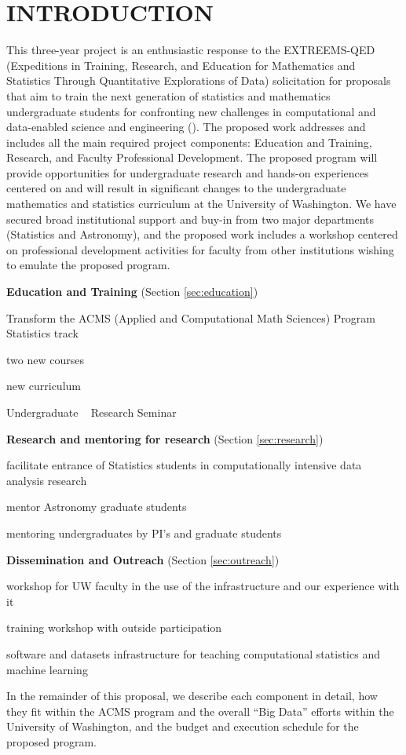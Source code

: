 \section{ INTRODUCTION}

This three-year project is an enthusiastic response to the EXTREEMS-QED (Expeditions in Training, Research, 
and Education for Mathematics and Statistics Through Quantitative Explorations of Data) solicitation for proposals
that aim to train the next generation of statistics and mathematics undergraduate students for confronting new
challenges in computational and data-enabled science and engineering (\cdse).  The proposed work addresses and 
includes all the main required project components: Education and Training, Research, and Faculty Professional 
Development. The proposed program will provide opportunities for undergraduate research and hands-on experiences 
centered on \cdse and will result in significant changes to the undergraduate mathematics and statistics curriculum 
at the University of Washington. We have secured broad institutional support and buy-in from two major departments 
(Statistics and Astronomy), and the proposed work includes a workshop centered on professional development activities
for faculty from other institutions wishing to emulate the proposed program. 

\bits
\item[]{\bf Education and Training} (Section \ref{sec:education})
\item Transform the ACMS (Applied and Computational Math Sciences) Program Statistics track
  \bits
  \item two new courses
  \item new curriculum 
  \item Undergraduate \cdse~ Research Seminar
  \eits
\item {\bf Research and mentoring for research} (Section \ref{sec:research})
  \bits
  \item facilitate entrance of Statistics students in computationally intensive data analysis research
  \item mentor Astronomy graduate students 
  \item mentoring undergraduates by PI's and graduate students
  \eits
\item {\bf Dissemination and Outreach} (Section \ref{sec:outreach})
  \bits
  \item workshop for UW faculty in the use of the infrastructure and our experience with it
  \item training workshop with outside participation 
  \item software and datasets infrastructure for teaching computational statistics and machine learning 
  \eits
\eits  


In the remainder of this proposal, we describe each component in
detail, how they fit within the ACMS program and the overall ``Big
Data'' efforts within the University of Washington, and the budget and
execution schedule for the proposed program.


